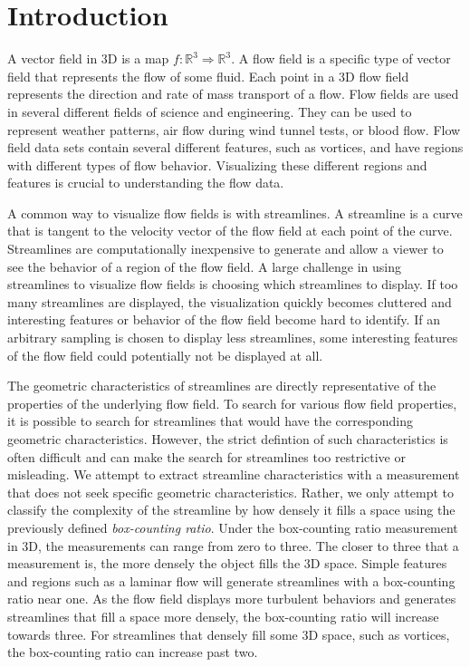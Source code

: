\documentclass{egpubl}
\newcommand {\emath}[1]  {\ensuremath{#1}}
\newcommand {\Real}[1]   {\emath{\mathbb{R}^{#1}}}   %
\newcommand {\Rthree}    {\Real{3}}                  %
\begin{document}

\section{Introduction}

A vector field in 3D is a map $f: \Rthree \Rightarrow \Rthree$.
A flow field is a specific type of vector field that represents the flow of some fluid.
Each point in a 3D flow field represents the direction and rate of mass transport of a flow.
Flow fields are used in several different fields of science and engineering.
They can be used to represent weather patterns, air flow during wind tunnel tests, or blood flow.
Flow field data sets contain several different features, such as vortices, and have regions with different types of flow behavior.
Visualizing these different regions and features is crucial to understanding the flow data.

A common way to visualize flow fields is with streamlines.
A streamline is a curve that is tangent to the velocity vector of the flow field at each point of the curve.
Streamlines are computationally inexpensive to generate and allow a viewer to see the behavior of a region of the flow field.
A large challenge in using streamlines to visualize flow fields is choosing which streamlines to display.
If too many streamlines are displayed, the visualization quickly becomes cluttered and interesting features or behavior of the flow field become hard to identify.
If an arbitrary sampling is chosen to display less streamlines, some interesting features of the flow field could potentially not be displayed at all.

The geometric characteristics of streamlines are directly representative of the properties of the underlying flow field.
To search for various flow field properties, it is possible to search for streamlines that would have the corresponding geometric characteristics.
However, the strict defintion of such characteristics is often difficult and can make the search for streamlines too restrictive or misleading.
We attempt to extract streamline characteristics with a measurement that does not seek specific geometric characteristics.
Rather, we only attempt to classify the complexity of the streamline by how densely it fills a space using the previously defined \textit{box-counting ratio}.
Under the box-counting ratio measurement in 3D, the measurements can range from zero to three.
The closer to three that a measurement is, the more densely the object fills the 3D space.
Simple features and regions such as a laminar flow will generate streamlines with a box-counting ratio near one.
As the flow field displays more turbulent behaviors and generates streamlines that fill a space more densely, the box-counting ratio will increase towards three.
For streamlines that densely fill some 3D space, such as vortices, the box-counting ratio can increase past two.
\end{document}
